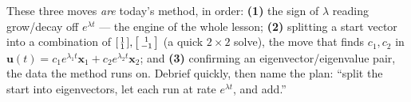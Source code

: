 \documentclass[10pt]{article}
\newcommand{\uu}{\mathbf{u}}
\newcommand{\xx}{\mathbf{x}}
\begin{document}
\begin{teachernote}
These three moves \emph{are} today's method, in order: \textbf{(1)} the sign of $\lambda$ reading grow/decay
off $e^{\lambda t}$ --- the engine of the whole lesson; \textbf{(2)} splitting a start vector into a
combination of $\begin{bsmallmatrix}1\\1\end{bsmallmatrix},\begin{bsmallmatrix}1\\-1\end{bsmallmatrix}$ (a quick
$2\times2$ solve), the move that finds $c_1,c_2$ in $\uu(t)=c_1e^{\lambda_1 t}\xx_1+c_2e^{\lambda_2 t}\xx_2$;
and \textbf{(3)} confirming an eigenvector/eigenvalue pair, the data the method runs on. Debrief quickly, then
name the plan: ``split the start into eigenvectors, let each run at rate $e^{\lambda t}$, and add.''
\end{teachernote}
\end{document}
